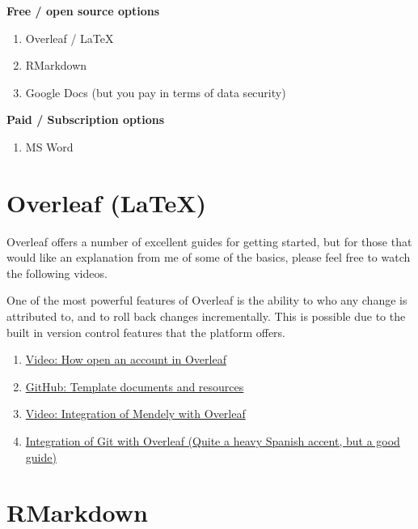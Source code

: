 \documentclass[
]{book}
\providecommand{\tightlist}{%
  \setlength{\itemsep}{0pt}\setlength{\parskip}{0pt}}
\begin{document}
\textbf{Free / open source options}

\begin{enumerate}
\def\labelenumi{\arabic{enumi}.}
\item
  Overleaf / LaTeX
\item
  RMarkdown
\item
  Google Docs (but you pay in terms of data security)
\end{enumerate}

\textbf{Paid / Subscription options}

\begin{enumerate}
\def\labelenumi{\arabic{enumi}.}
\tightlist
\item
  MS Word
\end{enumerate}

\hypertarget{overleaf-latex}{%
\section{Overleaf (LaTeX)}\label{overleaf-latex}}

Overleaf offers a number of excellent guides for getting started, but for those that would like an explanation from me of some of the basics, please feel free to watch the following videos.

One of the most powerful features of Overleaf is the ability to who any change is attributed to, and to roll back changes incrementally. This is possible due to the built in version control features that the platform offers.

\begin{enumerate}
\def\labelenumi{\arabic{enumi}.}
\item
  \href{https://www.youtube.com/watch?v=g8Ejj0T0yG4}{Video: How open an account in Overleaf}
\item
  \href{https://github.com/robabsmith/Example-project}{GitHub: Template documents and resources}
\item
  \href{https://www.loom.com/share/6d0d4f7108f041d082253c636a52dee8}{Video: Integration of Mendely with Overleaf}
\item
  \href{https://youtu.be/BAt5xYP70u0}{Integration of Git with Overleaf (Quite a heavy Spanish accent, but a good guide)}
\end{enumerate}

\hypertarget{rmarkdown}{%
\section{RMarkdown}\label{rmarkdown}}
\end{document}
